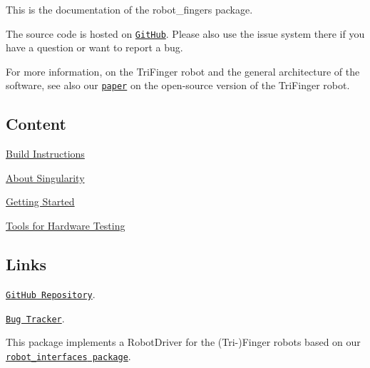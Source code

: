 This is the documentation of the {\ttfamily robot\+\_\+fingers} package.

The source code is hosted on \href{https://github.com/open-dynamic-robot-initiative/robot_fingers}{\tt Git\+Hub}. Please also use the issue system there if you have a question or want to report a bug.

For more information, on the Tri\+Finger robot and the general architecture of the software, see also our \href{https://arxiv.org/abs/2008.03596}{\tt paper} on the open-\/source version of the Tri\+Finger robot.

\subsection*{Content }


\begin{DoxyItemize}
\item \hyperlink{md_doc_installation}{Build Instructions}
\item \hyperlink{md_doc_singularity}{About Singularity}
\item \hyperlink{md_doc_getting_started}{Getting Started}
\item \hyperlink{md_doc_hardware_testing}{Tools for Hardware Testing}
\end{DoxyItemize}

\subsection*{Links }


\begin{DoxyItemize}
\item \href{https://github.com/open-dynamic-robot-initiative/robot_fingers}{\tt Git\+Hub Repository}.
\item \href{https://github.com/open-dynamic-robot-initiative/robot_fingers/issues}{\tt Bug Tracker}.
\item This package implements a {\ttfamily Robot\+Driver} for the (Tri-\/)Finger robots based on our \href{https://open-dynamic-robot-initiative.github.io/code_documentation/robot_interfaces/docs/doxygen/html/index.html}{\tt {\ttfamily robot\+\_\+interfaces} package}. 
\end{DoxyItemize}